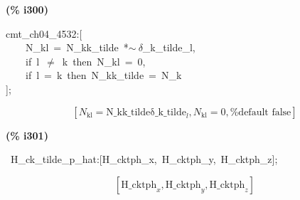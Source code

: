 \documentclass[fleqn]{article}
\begin{document}
\noindent
\begin{minipage}[t]{4.000000em}\color{red}\bfseries
(\% i300)	
\end{minipage}
\begin{minipage}[t]{\textwidth}\color{blue}
cmt\_ch04\_4532:[\\
\ \ \ \ N\_kl\ =\ N\_kk\_tilde\ *\ensuremath{\sim\ }\ensuremath{\delta}\_k\_tilde\_l,\ \\
\ \ \ \ if\ l\ \ensuremath{\neq}\ k\ then\ N\_kl\ =\ 0,\\
\ \ \ \ if\ l\ =\ k\ then\ N\_kk\_tilde\ =\ N\_k\\
];
\end{minipage}
\[\displaystyle \tag{\% o300} 
\left[ {N_{\ensuremath{\mathrm{kl}}}}=\ensuremath{\mathrm{N\_ kk\_ tilde}} {{\ensuremath{\mathrm{\delta \_ k\_ tilde}}}_l}\operatorname{,}{N_{\ensuremath{\mathrm{kl}}}}=0\operatorname{,}\mbox{%
false}\right] \mbox{}
\]


\noindent
\begin{minipage}[t]{4.000000em}\color{red}\bfseries
(\% i301)	
\end{minipage}
\begin{minipage}[t]{\textwidth}\color{blue}
\ H\_ck\_tilde\_p\_hat:[H\_cktph\_x,\ H\_cktph\_y,\ H\_cktph\_z];
\end{minipage}
\[\displaystyle \tag{\% o301} 
\left[ {{\ensuremath{\mathrm{H\_ cktph}}}_x}\operatorname{,}{{\ensuremath{\mathrm{H\_ cktph}}}_y}\operatorname{,}{{\ensuremath{\mathrm{H\_ cktph}}}_z}\right] \mbox{}
\]
\end{document}
